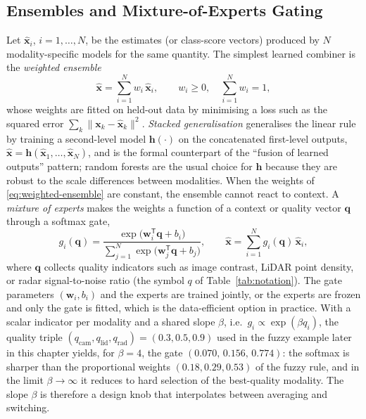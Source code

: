 \documentclass[graybox,envcountchap]{style/SNmono}
\begin{document}
\subsection{Ensembles and Mixture-of-Experts Gating}
\label{subsec:ensembles-moe}
Let $\widehat{\mathbf{x}}_i$, $i=1,\ldots,N$, be the estimates (or class-score vectors) produced by $N$ modality-specific models for the same quantity. The simplest learned combiner is the \emph{weighted ensemble}
\begin{equation}
\widehat{\mathbf{x}}=\sum_{i=1}^{N} w_i\,\widehat{\mathbf{x}}_i,\qquad w_i\ge 0,\quad \sum_{i=1}^{N}w_i=1,
\label{eq:weighted-ensemble}
\end{equation}
whose weights are fitted on held-out data by minimising a loss such as the squared error $\sum_k\|\mathbf{x}_k-\widehat{\mathbf{x}}_k\|^2$. \emph{Stacked generalisation} \cite{wolpert1992_stacking} generalises the linear rule by training a second-level model $\mathbf{h}(\cdot)$ on the concatenated first-level outputs, $\widehat{\mathbf{x}}=\mathbf{h}(\widehat{\mathbf{x}}_1,\ldots,\widehat{\mathbf{x}}_N)$, and is the formal counterpart of the ``fusion of learned outputs'' pattern; random forests \cite{breiman2001_rf} are the usual choice for $\mathbf{h}$ because they are robust to the scale differences between modalities. When the weights of \eqref{eq:weighted-ensemble} are constant, the ensemble cannot react to context. A \emph{mixture of experts} \cite{jacobs1991_moe} makes the weights a function of a context or quality vector $\mathbf{q}$ through a softmax gate,
\begin{equation}
g_i(\mathbf{q})=\frac{\exp\!\big(\mathbf{w}_i^{\mathsf T}\mathbf{q}+b_i\big)}{\sum_{j=1}^{N}\exp\!\big(\mathbf{w}_j^{\mathsf T}\mathbf{q}+b_j\big)},\qquad
\widehat{\mathbf{x}}=\sum_{i=1}^{N} g_i(\mathbf{q})\,\widehat{\mathbf{x}}_i ,
\label{eq:moe-gate}
\end{equation}
where $\mathbf{q}$ collects quality indicators such as image contrast, LiDAR point density, or radar signal-to-noise ratio (the symbol $q$ of Table~\ref{tab:notation}). The gate parameters $(\mathbf{w}_i,b_i)$ and the experts are trained jointly, or the experts are frozen and only the gate is fitted, which is the data-efficient option in practice. With a scalar indicator per modality and a shared slope $\beta$, i.e.\ $g_i\propto\exp(\beta q_i)$, the quality triple $(q_{\mathrm{cam}},q_{\mathrm{lid}},q_{\mathrm{rad}})=(0.3,0.5,0.9)$ used in the fuzzy example later in this chapter yields, for $\beta=4$, the gate $(0.070,\,0.156,\,0.774)$: the softmax is sharper than the proportional weights $(0.18,0.29,0.53)$ of the fuzzy rule, and in the limit $\beta\to\infty$ it reduces to hard selection of the best-quality modality. The slope $\beta$ is therefore a design knob that interpolates between averaging and switching.
\end{document}
